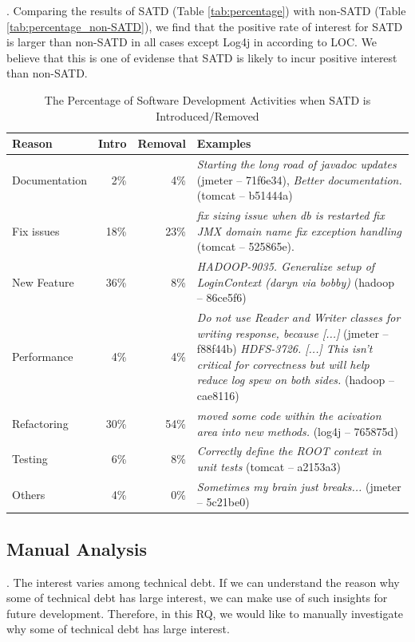 \documentclass[10pt, conference]{IEEEtran}
\newcommand{\smallsection}[1]{\vspace{1mm}\noindent {\bf #1}.\hspace{2mm}}
\begin{document}
\smallsection{Result}
Comparing the results of SATD (Table \ref{tab:percentage}) with non-SATD (Table \ref{tab:percentage_non-SATD}), we find that the positive rate of interest for SATD is larger than non-SATD in all cases except Log4j in according to LOC. We believe that this is one of evidense that SATD is likely to incur positive interest than non-SATD.

\begin{table}[t]
  \caption{The Percentage of Software Development Activities when SATD is Introduced/Removed}
  \label{tab:percentage_activities} 
  \centering

  \begin{tabular}{l|r|r|p{2.80in}}
  \hline
       \textbf{Reason} & \textbf{Intro} & \textbf{Removal} & \textbf{Examples} \\
  \hline
  Documentation & 2\%  &   4\% &  \textit{Starting the long road of javadoc updates} (jmeter -- 71f6e34), \textit{Better documentation.} (tomcat -- b51444a) \\
  Fix issues  &  18\%  &  23\% &  \textit{fix sizing issue when db is restarted fix JMX domain name fix exception handling} (tomcat -- 525865e). \\
  New Feature &  36\%  &   8\% &  \textit{HADOOP-9035. Generalize setup of LoginContext (daryn via bobby)} (hadoop -- 86ce5f6) \\
  Performance &   4\%  &   4\% &  \textit{Do not use Reader and Writer classes for writing response, because [...]} (jmeter -- f88f44b) \textit{HDFS-3726. [...] This isn't critical for correctness but will help reduce log spew on both sides.} (hadoop -- cae8116) \\ 
  Refactoring &  30\%  &  54\% &  \textit{moved some code within the acivation area into new methods.} (log4j -- 765875d) \\
  Testing     &   6\%  &   8\% &  \textit{Correctly define the ROOT context in unit tests} (tomcat -- a2153a3) \\
  Others      &   4\%  &   0\% &  \textit{Sometimes my brain just breaks...} (jmeter -- 5c21be0) \\
  \hline
  \end{tabular}
\end{table}

\subsection{Manual Analysis}
\smallsection{Motivation}
The interest varies among technical debt. If we can understand the reason why some of technical debt has large interest, we can make use of such insights for future development. Therefore, in this RQ, we would like to manually investigate why some of technical debt has large interest.
\end{document}
